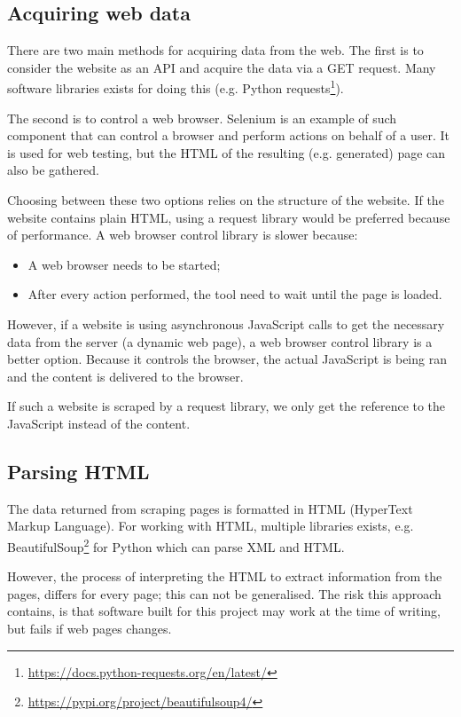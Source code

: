 \documentclass{ou-report}
\begin{document}
\subsection{Acquiring web data}
There are two main methods for acquiring data from the web. The first is to 
consider the website as an API and acquire the data via a GET request. Many 
software libraries exists for doing this (e.g. Python 
requests\footnote{\url{https://docs.python-requests.org/en/latest/}}).

The second is to control a web browser. Selenium is an example of such 
component that can control a browser and perform actions on behalf of a user. 
It is used for web testing, but the HTML of the resulting (e.g. generated) page 
can also be gathered.

Choosing between these two options relies on the structure of the website. If the 
website contains plain HTML, using a request library would be preferred because 
of performance. A web browser control library is slower because:
\begin{itemize}
    \item A web browser needs to be started;
    \item After every action performed, the tool need to wait until the page is
    loaded.
\end{itemize}

However, if a website is using asynchronous JavaScript calls to get the 
necessary data from the server (a dynamic web page), a web browser control 
library is a better option. Because it controls the browser, the actual 
JavaScript is being ran and the content is delivered to the browser.

If such a website is scraped by a request library, we only get the reference 
to the JavaScript instead of the content.
\subsection{Parsing HTML}
\label{gen_impl:parsing_html}
The data returned from scraping pages is formatted in HTML (HyperText Markup 
Language). For working with
HTML, multiple libraries exists, e.g. 
BeautifulSoup\footnote{\url{https://pypi.org/project/beautifulsoup4/}} for 
Python which can parse XML and HTML.

However, the process of interpreting the HTML to extract information from the 
pages, differs for every page; this can not be generalised. 
The risk this approach contains, is that software built for this project may
work at the time of writing, but fails if web pages changes.
\end{document}

